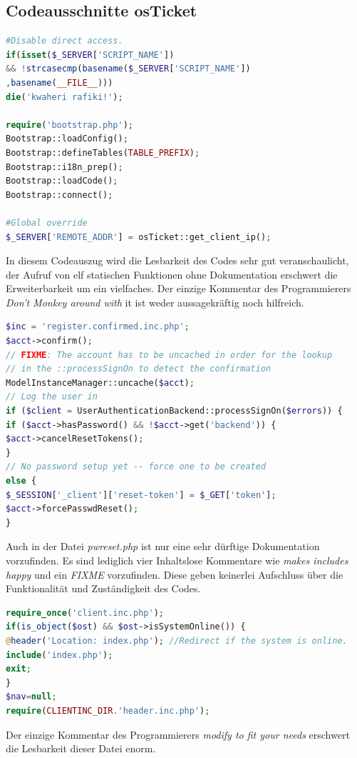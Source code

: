 \subsection{Codeausschnitte osTicket}
\begin{lstlisting}[language=PHP, caption=main.inc.php, firstnumber=18]
#Disable direct access.
if(isset($_SERVER['SCRIPT_NAME'])
&& !strcasecmp(basename($_SERVER['SCRIPT_NAME'])
,basename(__FILE__)))
die('kwaheri rafiki!');

require('bootstrap.php');
Bootstrap::loadConfig();
Bootstrap::defineTables(TABLE_PREFIX);
Bootstrap::i18n_prep();
Bootstrap::loadCode();
Bootstrap::connect();

#Global override
$_SERVER['REMOTE_ADDR'] = osTicket::get_client_ip();

\end{lstlisting}
In diesem Codeauszug wird die Lesbarkeit des Codes sehr gut veranschaulicht, der Aufruf von elf statischen Funktionen ohne Dokumentation erschwert die Erweiterbarkeit um ein vielfaches. Der einzige Kommentar des Programmierers \textit{Don't Monkey around with} it ist weder aussagekräftig noch hilfreich.
\newpage
\begin{lstlisting}[language=PHP, caption=pwreset.php, firstnumber=51]
$inc = 'register.confirmed.inc.php';
$acct->confirm();
// FIXME: The account has to be uncached in order for the lookup
// in the ::processSignOn to detect the confirmation
ModelInstanceManager::uncache($acct);
// Log the user in
if ($client = UserAuthenticationBackend::processSignOn($errors)) {
if ($acct->hasPassword() && !$acct->get('backend')) {
$acct->cancelResetTokens();
}
// No password setup yet -- force one to be created
else {
$_SESSION['_client']['reset-token'] = $_GET['token'];
$acct->forcePasswdReset();
}
\end{lstlisting}
Auch in der Datei \textit{pwreset.php} ist nur eine sehr dürftige Dokumentation vorzufinden. Es sind lediglich vier Inhaltslose Kommentare wie \textit{makes includes happy} und ein \textit{FIXME} vorzufinden. Diese geben keinerlei Aufschluss über die Funktionalität und Zuständigkeit des Codes.
\newpage
\begin{lstlisting}[language=PHP, caption=offline.php, firstnumber=16]
require_once('client.inc.php');
if(is_object($ost) && $ost->isSystemOnline()) {
@header('Location: index.php'); //Redirect if the system is online.
include('index.php');
exit;
}
$nav=null;
require(CLIENTINC_DIR.'header.inc.php');
\end{lstlisting}
Der einzige Kommentar des Programmierers \textit{modify to fit your needs} erschwert die Lesbarkeit dieser Datei enorm.



